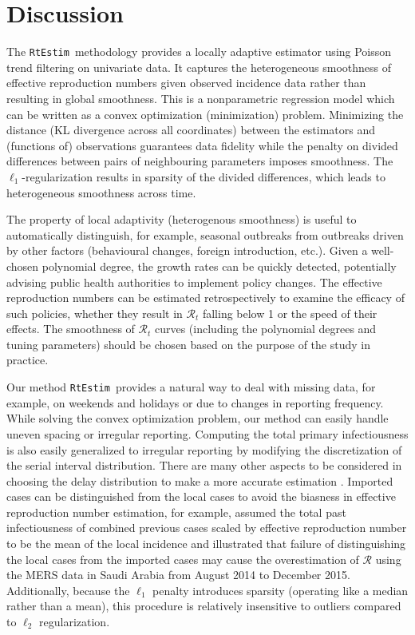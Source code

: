 \documentclass[10pt,letterpaper]{article}
\def\RtEstim{\texttt{RtEstim}}
\def\calR{\mathcal{R}}
\newcommand{\citep}[1]{\cite{#1}}
\begin{document}
\section{Discussion}
\label{sec:disc}

The \RtEstim\ methodology provides a locally adaptive estimator using Poisson
trend filtering on univariate data. It captures the heterogeneous smoothness of
effective reproduction numbers given observed incidence data rather than
resulting in global smoothness. This is a nonparametric regression model which
can be written as a convex optimization (minimization) problem. Minimizing the
distance (KL divergence across all coordinates) between the estimators and
(functions of) observations guarantees data fidelity while the penalty on divided
differences between pairs of neighbouring parameters imposes smoothness. The
$\ell_1$-regularization results in sparsity of the divided differences, which
leads to heterogeneous smoothness across time. 


The property of local adaptivity (heterogenous smoothness) is useful to
automatically distinguish, for example, seasonal outbreaks from outbreaks driven
by other factors (behavioural changes, foreign introduction, etc.). Given a
well-chosen polynomial degree, the growth rates can be quickly detected, 
potentially advising public health authorities to implement policy changes. The effective
reproduction numbers can be estimated retrospectively to examine the efficacy of
such policies, whether they result in $\calR_t$ falling below 1 or the speed of
their effects. The smoothness of $\calR_t$ curves (including the polynomial 
degrees and tuning parameters) should be chosen based on the purpose of the 
study in practice. 


Our method \RtEstim\ provides a natural way to deal with missing data, for
example, on weekends and holidays or due to changes in reporting frequency.
While solving the convex optimization problem, our method can easily 
handle uneven spacing or irregular reporting. Computing the total
primary infectiousness is also easily generalized to irregular reporting by
modifying the discretization of the serial interval distribution. There are many
other aspects to be considered in choosing the delay distribution to make a more accurate
estimation \citep{park2024estimating}. 
Imported cases can be distinguished from the local cases to avoid the biasness 
in effective reproduction number estimation, for example, \cite{thompson2019improved} 
assumed the total past infectiousness of combined previous cases scaled by effective 
reproduction number to be the mean of the local incidence and illustrated that 
failure of distinguishing the local cases from the imported cases may cause the overestimation 
of $\calR$ using the MERS data in Saudi Arabia from August 2014 to December 2015. 
Additionally, because the $\ell_1$ penalty introduces sparsity (operating like a median
rather than a mean), this procedure is relatively insensitive to outliers
compared to $\ell_2$ regularization.
\end{document}
